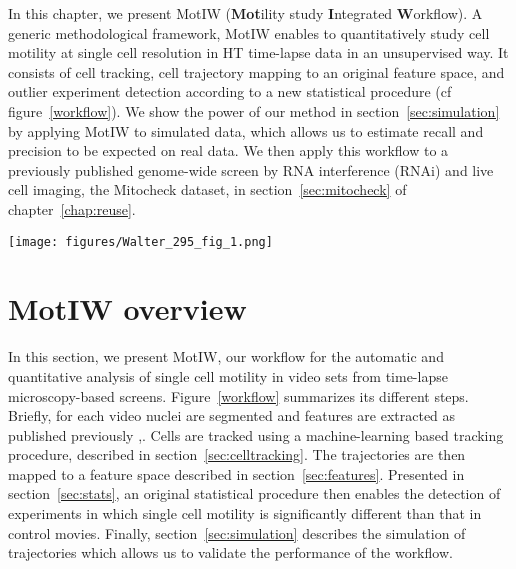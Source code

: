 
In this chapter, we present MotIW (\textbf{Mot}ility study \textbf{I}ntegrated \textbf{W}orkflow). A generic methodological framework, MotIW enables to quantitatively study cell motility at single cell resolution in HT time-lapse data in an unsupervised way. It consists of cell tracking, cell trajectory mapping to an original feature space, and outlier experiment detection according to a new statistical procedure (cf figure~\ref{workflow}). We show the power of our method in section~\ref{sec:simulation} by applying MotIW to simulated data, which allows us to estimate recall and precision to be expected on real data. We then apply this workflow to a previously published genome-wide
screen by RNA interference (RNAi) and live cell imaging, the Mitocheck dataset, in section~\ref{sec:mitocheck} of chapter~\ref{chap:reuse}.

\begin{figure*}[ht]
\centerline{\texttt{[image: figures/Walter\_295\_fig\_1.png]}}
\caption{Overview of MotIW}
\label{workflow}
\end{figure*}  

\section{MotIW overview}
\label{sec:workflow}
In this section, we present MotIW, our workflow for the automatic and
quantitative analysis of single cell motility in video sets from
time-lapse microscopy-based screens. Figure~\ref{workflow} summarizes
its different steps. 
Briefly, for each video nuclei are segmented and features are
extracted as published previously \cite{Walter2010},\cite{cellcognition}. Cells are tracked using a
machine-learning based tracking procedure, described in
section~\ref{sec:celltracking}. The trajectories are then mapped to a
feature space described in section~\ref{sec:features}. Presented in
section~\ref{sec:stats}, an original statistical procedure then
enables the detection of experiments in which single cell motility is
significantly different than that in control movies. Finally,
section~\ref{sec:simulation} describes the simulation of trajectories
which allows us to validate the performance of the workflow.

